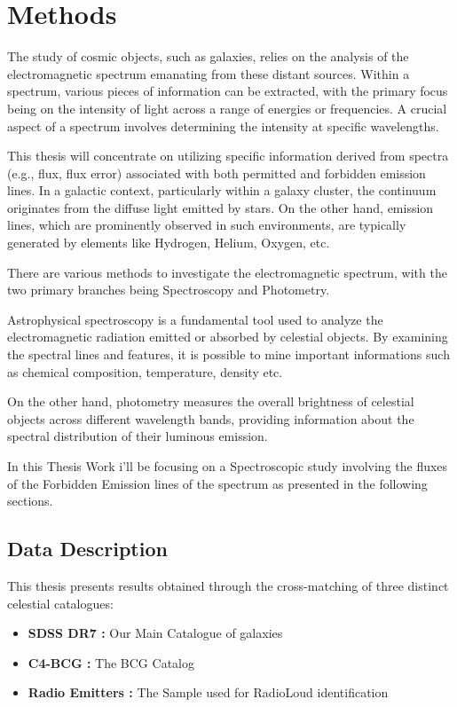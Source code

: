 \chapter{Methods}
The study of cosmic objects, such as galaxies, relies on the analysis of the electromagnetic spectrum emanating from these distant sources. Within a spectrum, various pieces of information can be extracted, with the primary focus being on the intensity of light across a range of energies or frequencies. A crucial aspect of a spectrum involves determining the intensity at specific wavelengths.

This thesis will concentrate on utilizing specific information derived from spectra (e.g., flux, flux error) associated with both permitted and forbidden emission lines. In a galactic context, particularly within a galaxy cluster, the continuum originates from the diffuse light emitted by stars. On the other hand, emission lines, which are prominently observed in such environments, are typically generated by elements like Hydrogen, Helium, Oxygen, etc.

There are various methods to investigate the electromagnetic spectrum, with the two primary branches being Spectroscopy and Photometry.

Astrophysical spectroscopy is a fundamental tool used to analyze the electromagnetic radiation emitted or absorbed by celestial objects. By examining the spectral lines and features, it is possible to mine important informations such as chemical composition, temperature, density etc.

On the other hand, photometry measures the overall brightness of celestial objects across different wavelength bands, providing information about the spectral distribution of their luminous emission. 

In this Thesis Work i'll be focusing on a Spectroscopic study involving the fluxes of the Forbidden Emission lines of the spectrum as presented in the following sections.

\section{Data Description}
This thesis presents results obtained through the cross-matching of three distinct celestial catalogues:
\begin{itemize}
	\item\textbf{SDSS DR7 :} Our Main Catalogue of galaxies
	\item \textbf{C4-BCG :} The BCG Catalog 
	\item \textbf{Radio Emitters :}  The Sample used for RadioLoud identification
\end{itemize}

